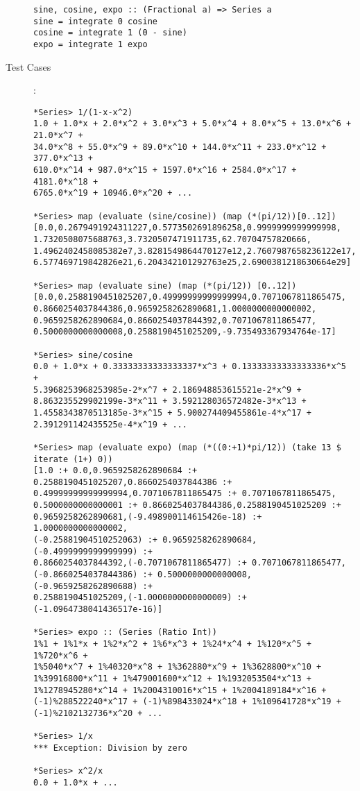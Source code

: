\documentclass[12pt]{report}
\begin{document}
\begin{description}
\begin{verbatim}
sine, cosine, expo :: (Fractional a) => Series a
sine = integrate 0 cosine
cosine = integrate 1 (0 - sine)
expo = integrate 1 expo
\end{verbatim}

\newpage

\item[Test Cases]: \\
\begin{verbatim}
*Series> 1/(1-x-x^2)
1.0 + 1.0*x + 2.0*x^2 + 3.0*x^3 + 5.0*x^4 + 8.0*x^5 + 13.0*x^6 + 21.0*x^7 +
34.0*x^8 + 55.0*x^9 + 89.0*x^10 + 144.0*x^11 + 233.0*x^12 + 377.0*x^13 +
610.0*x^14 + 987.0*x^15 + 1597.0*x^16 + 2584.0*x^17 + 4181.0*x^18 +
6765.0*x^19 + 10946.0*x^20 + ...

*Series> map (evaluate (sine/cosine)) (map (*(pi/12))[0..12])
[0.0,0.2679491924311227,0.5773502691896258,0.9999999999999998,
1.7320508075688763,3.7320507471911735,62.70704757820666,
1.4962402458085382e7,3.8281549864470127e12,2.7607987658236122e17,
6.577469719842826e21,6.204342101292763e25,2.6900381218630664e29]

*Series> map (evaluate sine) (map (*(pi/12)) [0..12])
[0.0,0.2588190451025207,0.49999999999999994,0.7071067811865475,
0.8660254037844386,0.9659258262890681,1.0000000000000002,
0.9659258262890684,0.8660254037844392,0.7071067811865477,
0.5000000000000008,0.2588190451025209,-9.735493367934764e-17]

*Series> sine/cosine
0.0 + 1.0*x + 0.33333333333333337*x^3 + 0.13333333333333336*x^5 + 
5.3968253968253985e-2*x^7 + 2.186948853615521e-2*x^9 + 
8.863235529902199e-3*x^11 + 3.592128036572482e-3*x^13 + 
1.4558343870513185e-3*x^15 + 5.900274409455861e-4*x^17 + 
2.391291142435525e-4*x^19 + ...

*Series> map (evaluate expo) (map (*((0:+1)*pi/12)) (take 13 $ iterate (1+) 0))
[1.0 :+ 0.0,0.9659258262890684 :+ 0.2588190451025207,0.8660254037844386 :+
0.49999999999999994,0.7071067811865475 :+ 0.7071067811865475,
0.5000000000000001 :+ 0.8660254037844386,0.2588190451025209 :+ 
0.9659258262890681,(-9.498900114615426e-18) :+ 1.0000000000000002,
(-0.25881904510252063) :+ 0.9659258262890684,(-0.4999999999999999) :+
0.8660254037844392,(-0.7071067811865477) :+ 0.7071067811865477,
(-0.8660254037844386) :+ 0.5000000000000008,(-0.9659258262890688) :+ 
0.2588190451025209,(-1.0000000000000009) :+ (-1.0964738041436517e-16)]

*Series> expo :: (Series (Ratio Int))
1%1 + 1%1*x + 1%2*x^2 + 1%6*x^3 + 1%24*x^4 + 1%120*x^5 + 1%720*x^6 +
1%5040*x^7 + 1%40320*x^8 + 1%362880*x^9 + 1%3628800*x^10 + 
1%39916800*x^11 + 1%479001600*x^12 + 1%1932053504*x^13 + 
1%1278945280*x^14 + 1%2004310016*x^15 + 1%2004189184*x^16 + 
(-1)%288522240*x^17 + (-1)%898433024*x^18 + 1%109641728*x^19 + 
(-1)%2102132736*x^20 + ...

*Series> 1/x
*** Exception: Division by zero

*Series> x^2/x
0.0 + 1.0*x + ...
\end{verbatim}

\end{description}
\end{document}
